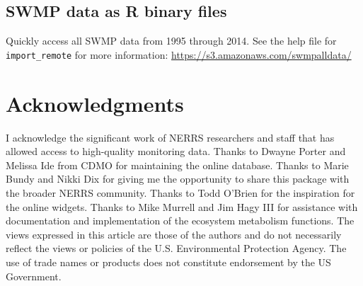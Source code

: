 \documentclass[10pt,letterpaper]{article}\usepackage[]{graphicx}\usepackage[]{color}
\begin{document}
\subsection*{\ac{SWMP} data as R binary files}

Quickly access all \ac{SWMP} data from 1995 through 2014. See the help file for \texttt{import\_remote} for more information: \href{https://s3.amazonaws.com/swmpalldata/}{https://s3.amazonaws.com/swmpalldata/}

\section*{Acknowledgments}

I acknowledge the significant work of \ac{NERRS} researchers and staff that has allowed access to high-quality monitoring data.  Thanks to Dwayne Porter and Melissa Ide from \ac{CDMO} for maintaining the online database.  Thanks to Marie Bundy and Nikki Dix for giving me the opportunity to share this package with the broader \ac{NERRS} community.  Thanks to Todd O'Brien for the inspiration for the online widgets. Thanks to Mike Murrell and Jim Hagy III for assistance with documentation and implementation of the ecosystem metabolism functions. The views expressed in this article are those of the authors and do not necessarily reflect the views or policies of the U.S. Environmental Protection Agency.  The use of trade names or products does not constitute endorsement by the US Government.   

\nolinenumbers


\end{document}
